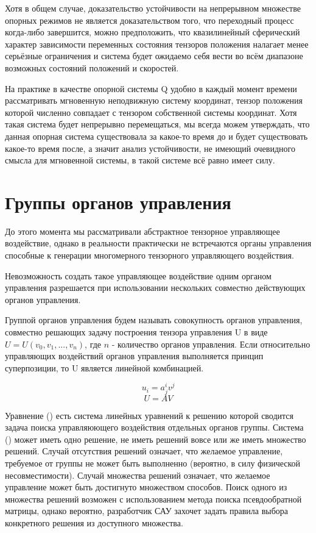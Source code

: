 \documentclass[a4paper]{article}
\begin{document}
Хотя в общем случае, доказательство устойчивости на непрерывном множестве опорных режимов не является доказательством того, что переходный процесс когда-либо завершится, можно предположить, что квазилинейный сферический характер зависимости переменных состояния тензоров положения налагает менее серьёзные ограничения и система будет ожидаемо себя вести во всём диапазоне возможных состояний положений и скоростей.

На практике в качестве опорной системы Q удобно в каждый момент времени рассматривать мгновенную неподвижную систему координат, тензор положения которой численно совпадает с тензором собственной системы координат. Хотя такая система будет непрерывно перемещаться, мы всегда можем утверждать, что данная опорная система существовала за какое-то время до и будет существовать какое-то время после, а значит анализ устойчивости, не имеющий очевидного смысла для мгновенной системы, в такой системе всё равно имеет силу. 

\section{Группы органов управления}
До этого момента мы рассматривали абстрактное тензорное управляющее воздействие, однако в реальности практически не встречаются органы управления способные к генерации многомерного тензорного управляющего воздействия.

Невозможность создать такое управляющее воздействие одним органом управления разрешается при использовании нескольких совместно действующих органов управления.

Группой органов управления будем называть совокупность органов управления, совместно решающих задачу построения тензора управления U в виде $U = U(v_0, v_1, ..., v_n)$, где $n$ - количество органов управления. Если относительно управляющих воздействий органов управления выполняется принцип суперпозиции, то U является линейной комбинацией. 

\begin{equation}u_i=a^i_jv^j\end{equation}
\begin{equation}U=AV\end{equation}

Уравнение () есть система линейных уравнений к решению которой сводится задача поиска управляюющего воздействия отдельных органов группы. Система () может иметь одно решение, не иметь решений вовсе или же иметь множество решений. Случай отсутствия решений означает, что желаемое управление, требуемое от группы не может быть выполненно (вероятно, в силу физической несовместимости). Случай множества решений означает, что желаемое управление может быть достигнуто множеством способов. Поиск одного из множества решений возможен с использованием метода поиска псевдообратной матрицы, однако вероятно, разработчик САУ захочет задать правила выбора конкретного решения из доступного множества.
\end{document}

